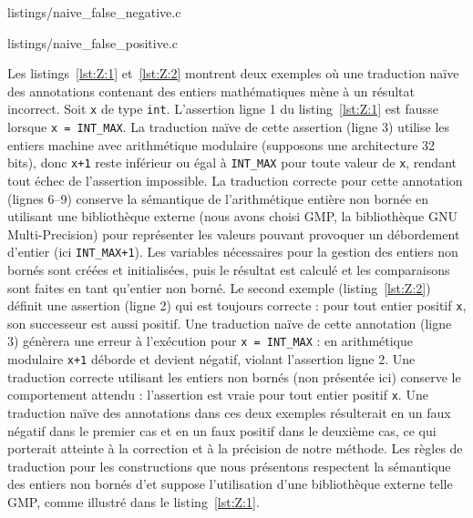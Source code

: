
                {listings/naive_false_negative.c}


                {listings/naive_false_positive.c}


Les listings~\ref{lst:Z:1} et~\ref{lst:Z:2} montrent deux exemples où
une traduction naïve des annotations contenant des entiers mathématiques mène
à un résultat incorrect.
Soit \lstinline'x' de type \lstinline'int'.
L'assertion ligne 1 du listing~\ref{lst:Z:1} est fausse lorsque
\lstinline'x = INT_MAX'.
La traduction naïve de cette assertion (ligne 3) utilise les entiers machine
avec arithmétique modulaire (supposons une architecture 32 bits), donc
\lstinline'x+1' reste inférieur ou égal à \lstinline'INT_MAX' pour toute valeur
de \lstinline'x', rendant tout échec de l'assertion impossible.
La traduction correcte pour cette annotation (lignes 6--9) conserve la
sémantique de l'arithmétique entière non bornée en utilisant une bibliothèque
externe (nous avons choisi GMP, la bibliothèque GNU Multi-Precision) pour
représenter les valeurs pouvant provoquer un débordement d'entier (ici
\lstinline'INT_MAX+1').
Les variables nécessaires pour la gestion des entiers non bornés sont créées et
initialisées, puis le résultat est calculé et les comparaisons sont faites en
tant qu'entier non borné.
Le second exemple (listing~\ref{lst:Z:2}) définit une assertion \eacsl (ligne 2)
qui est toujours correcte : pour tout entier positif \lstinline'x', son
successeur est aussi positif.
Une traduction naïve de cette annotation (ligne 3) génèrera une erreur à
l'exécution pour \lstinline'x = INT_MAX' : en arithmétique modulaire
\lstinline'x+1' déborde et devient négatif, violant l'assertion ligne 2.
Une traduction correcte utilisant les entiers non bornés (non présentée ici)
conserve le comportement attendu : l'assertion est vraie pour tout entier
positif \lstinline'x'.
Une traduction naïve des annotations dans ces deux exemples résulterait en un
faux négatif dans le premier cas et en un faux positif dans le deuxième cas, ce
qui porterait atteinte à la correction et à la précision de notre méthode.
Les règles de traduction pour les constructions \eacsl que nous présentons
respectent la sémantique des entiers non bornés d'\eacsl et suppose
l'utilisation d'une bibliothèque externe telle GMP, comme illustré dans le
listing~\ref{lst:Z:1}.



